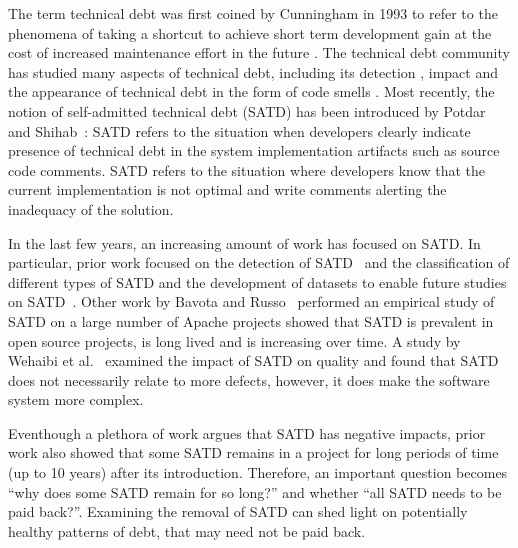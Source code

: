 
The term technical debt was first coined by Cunningham in 1993 to refer to the phenomena of taking a shortcut to achieve short term development gain at the cost of increased maintenance effort in the future \cite{Cunningham1992WPM}. The technical debt community has studied many aspects of technical debt, including its detection \cite{Zazworka2013EASE}, impact \cite{Zazworka2011MTD} and the appearance of technical debt in the form of code smells \cite{Fontana2012MTD}. 
Most recently, the notion of self-admitted technical debt (SATD) has been introduced by Potdar and Shihab~\cite{Potdar2014ICSME}: SATD refers to the situation when developers clearly indicate presence of
technical debt in the system implementation artifacts such as source code comments.
SATD refers to the situation where developers know that the current implementation is not optimal and write comments alerting the inadequacy of the solution. 


In the last few years, an increasing amount of work has focused on SATD. In particular, prior work focused on the detection of SATD~\cite{Potdar2014ICSME} and the classification of different types of SATD and the development of datasets to enable future studies on SATD~\cite{Maldonado2015MTD}. Other work by Bavota and Russo~\cite{Bavota2016MSR} performed an empirical study of SATD on a large number of Apache projects showed that SATD is prevalent in open source projects, is long lived and is increasing over time. A study by Wehaibi et al.~\cite{Wehaibi2016SANER} examined the impact of SATD on quality and found that SATD does not necessarily relate to more defects, however, it does make the software system more complex.

Eventhough a plethora of work argues that SATD has negative impacts, prior work also showed that some SATD remains in a project for long periods of time (up to 10 years) after its introduction. Therefore, an important question becomes ``why does some SATD remain for so long?'' and whether ``all SATD needs to be paid back?''. Examining the removal of SATD can shed light on potentially healthy patterns of debt, that may need not be paid back.

